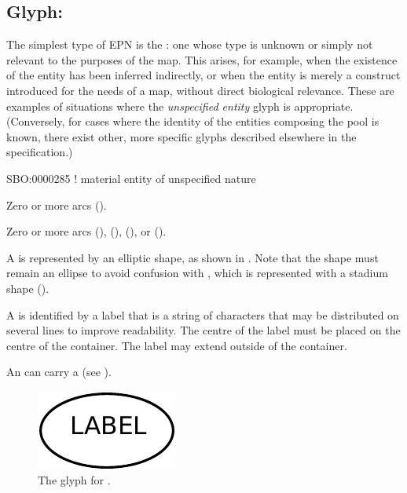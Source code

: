 
\subsection{Glyph: }
\label{sec:unspecifiedEntity}

The simplest type of EPN is the : one whose type is unknown or simply not relevant to the purposes of the map.
This arises, for example, when the existence of the entity has been inferred indirectly, or when the entity is merely a construct introduced for the needs of a map, without direct biological relevance.
These are examples of situations where the \emph{unspecified entity} glyph is appropriate.
(Conversely, for cases where the identity of the entities composing the pool is known, there exist other, more specific glyphs described elsewhere in the specification.)

\begin{glyphDescription}

\glyphSboTerm
 SBO:0000285 ! material entity of unspecified nature


\glyphIncoming
Zero or more  arcs ().



\glyphOutgoing
Zero or more  arcs (),  (),  (), or  ().


\glyphContainer
A  is represented by an elliptic shape, as shown in .
Note that the shape must remain an ellipse to avoid confusion with , which is represented with a stadium shape ().

\glyphLabel
A  is identified by a label  that is a string of characters that may be distributed on several lines to improve readability.
The centre of the label must be placed on the centre of the container.
The label may extend outside of the container.



\glyphAux
An  can carry a  (see ).

\end{glyphDescription}

\begin{figure}[H]
  \centering
  \includegraphics{images/build/unspecified.pdf}
  \caption{The \PD glyph for .}
  \label{fig:unspecified}
\end{figure}

